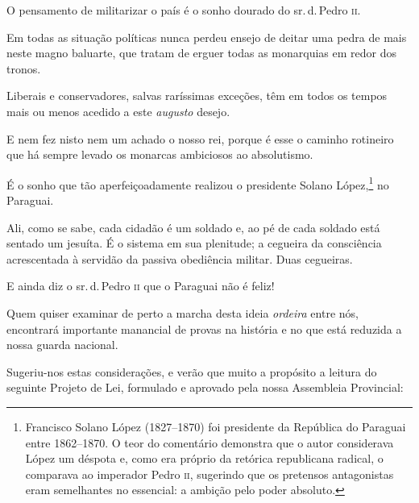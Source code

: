 O pensamento de militarizar o país é o sonho dourado do sr.\,d.\,Pedro \textsc{ii}.

Em todas as situação políticas nunca perdeu ensejo de deitar uma pedra
de mais neste magno baluarte, que tratam de erguer todas as monarquias
em redor dos tronos.

Liberais e conservadores, salvas raríssimas exceções, têm em todos os
tempos mais ou menos acedido a este \emph{augusto} desejo.

E nem fez nisto nem um achado o nosso rei, porque é esse o caminho
rotineiro que há sempre levado os monarcas ambiciosos ao absolutismo.

É o sonho que tão aperfeiçoadamente realizou o presidente Solano
López,\footnote{Francisco Solano López (1827--1870) foi presidente da
  República do Paraguai entre 1862--1870. O teor do comentário demonstra
  que o autor considerava López um déspota e, como era próprio da
  retórica republicana radical, o comparava ao imperador Pedro \textsc{ii},
  sugerindo que os pretensos antagonistas eram semelhantes no essencial:
  a ambição pelo poder absoluto.} no Paraguai.

Ali, como se sabe, cada cidadão é um soldado e, ao pé de cada soldado
está sentado um jesuíta. É o sistema em sua plenitude; a cegueira da
consciência acrescentada à servidão da passiva obediência militar. Duas
cegueiras.

E ainda diz o sr.\,d.\,Pedro \textsc{ii} que o Paraguai não é feliz!

Quem quiser examinar de perto a marcha desta ideia \emph{ordeira} entre
nós, encontrará importante manancial de provas na história e no que está
reduzida a nossa guarda nacional.

Sugeriu-nos estas considerações, e verão que muito a propósito a leitura
do seguinte Projeto de Lei, formulado e aprovado pela nossa Assembleia
Provincial:

